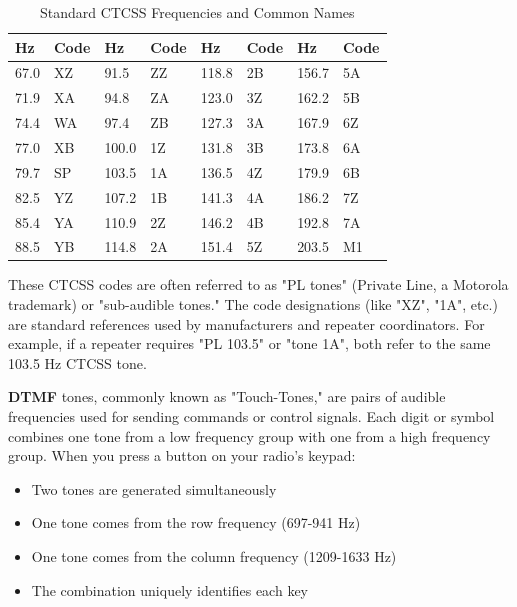 \begin{table}[h]
    \centering
    \caption{Standard CTCSS Frequencies and Common Names}
    \begin{tabular}{|l|l||l|l||l|l||l|l|}
        \hline
        \textbf{Hz} & \textbf{Code} & \textbf{Hz} & \textbf{Code} & \textbf{Hz} & \textbf{Code} & \textbf{Hz} & \textbf{Code} \\
        \hline
        67.0 & XZ & 91.5 & ZZ & 118.8 & 2B & 156.7 & 5A \\
        71.9 & XA & 94.8 & ZA & 123.0 & 3Z & 162.2 & 5B \\
        74.4 & WA & 97.4 & ZB & 127.3 & 3A & 167.9 & 6Z \\
        77.0 & XB & 100.0 & 1Z & 131.8 & 3B & 173.8 & 6A \\
        79.7 & SP & 103.5 & 1A & 136.5 & 4Z & 179.9 & 6B \\
        82.5 & YZ & 107.2 & 1B & 141.3 & 4A & 186.2 & 7Z \\
        85.4 & YA & 110.9 & 2Z & 146.2 & 4B & 192.8 & 7A \\
        88.5 & YB & 114.8 & 2A & 151.4 & 5Z & 203.5 & M1 \\
        \hline
    \end{tabular}
    \label{tab:ctcss_tones}
\end{table}

These CTCSS codes are often referred to as "PL tones" (Private Line, a Motorola trademark) or "sub-audible tones." The code designations (like "XZ", "1A", etc.) are standard references used by manufacturers and repeater coordinators. For example, if a repeater requires "PL 103.5" or "tone 1A", both refer to the same 103.5 Hz CTCSS tone.

\textbf{DTMF} tones, commonly known as "Touch-Tones," are pairs of audible frequencies used for sending commands or control signals. Each digit or symbol combines one tone from a low frequency group with one from a high frequency group. When you press a button on your radio's keypad:
\begin{itemize}
    \item Two tones are generated simultaneously
    \item One tone comes from the row frequency (697-941 Hz)
    \item One tone comes from the column frequency (1209-1633 Hz)
    \item The combination uniquely identifies each key
\end{itemize}

